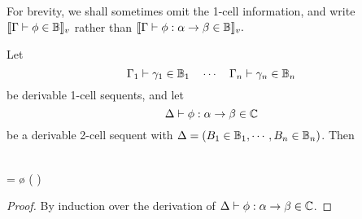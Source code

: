 \documentclass{robinthesisdraft}
\begin{document}
For brevity, we shall sometimes omit the 1-cell information, and write
$\semint{\Gamma\proves\phi\in\CB}$ rather than
\(
	\semint{\Gamma\proves\phi: \alpha\to\beta \in\CB}.
\)

\begin{lemma}\label{lemma-sem-1in2}
	Let
	\[
		\Gamma_{1} \vdash \gamma_{1}\in\mathbb{B}_{1}
		\quad\cdots\quad
		\Gamma_{n} \vdash \gamma_{n}\in\mathbb{B}_{n}
	\]
	be derivable 1-cell sequents, and let
	\[
		\Delta\vdash \phi: \alpha\to\beta\in\mathbb{C}
	\]
	be a derivable 2-cell sequent with
	$\Delta = (B_{1}\in\mathbb{B}_{1}, \cdots, B_{n}\in\mathbb{B}_{n})$.
	Then
	\begin{mmulti}
		\\ =
		\semint{\Delta\proves\phi:\alpha\to\beta\in\C}
		\o
		\Bigl(
			\tn\cdots\tn
		\Bigr)
	\end{mmulti}
\end{lemma}
\begin{proof}
	By induction over the derivation of $\Delta\vdash \phi: \alpha\to\beta\in\mathbb{C}$.
\end{proof}
\end{document}
